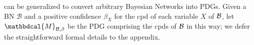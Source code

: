 \documentclass[letterpaper]{article} %
\theoremstyle{plain}
\theoremstyle{definition}
\theoremstyle{remark}
\newcommand{\dg}[1]{\mathbdcal{#1}}
\newcommand{\PDGof}[1]{{\dg M}_{#1}}
\begin{document}
 can be generalized to convert arbitrary Bayesian Networks into PDGs.
Given a BN $\mathcal B$ and a positive confidence $\beta_X$ for
the cpd of each variable $X$ of $\cal B$,
let $\PDGof{\mathcal B, \beta}$
be the PDG comprising the cpds of $\cal B$
in this way; we defer the straightforward formal details to the appendix. 
\end{document}
